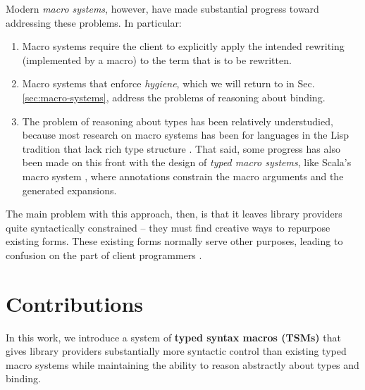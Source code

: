 Modern \emph{macro systems}, however, have made substantial progress toward addressing these problems. In particular:
\begin{enumerate}
\item Macro systems require the client to explicitly apply the intended rewriting (implemented by a macro) to the term that is to be rewritten. 
\item Macro systems that enforce \emph{hygiene}, which we will return to in Sec. \ref{sec:macro-systems}, address the problems of reasoning about binding. 
\item The problem of reasoning about types has been relatively understudied, because most research on macro systems has been for languages in the Lisp tradition that lack rich type structure \cite{mccarthy1978history}. That said, some progress has also been made on this front with the design of \emph{typed macro systems}, like Scala's macro system \cite{ScalaMacros2013}, where annotations constrain the macro arguments and the generated expansions.
\end{enumerate}

The main problem with this approach, then, is that it leaves library providers quite syntactically constrained -- they must find creative ways to repurpose existing forms. These existing forms normally serve other purposes, leading to confusion on the part of client programmers \cite{pane1996usability}.

\vspace{-10px}
\section{Contributions}\label{sec:contributions}

In this work, we introduce a system of \textbf{typed syntax macros (TSMs)} that gives library providers substantially more syntactic control than existing typed macro systems while maintaining the ability to reason abstractly about types and binding.%

